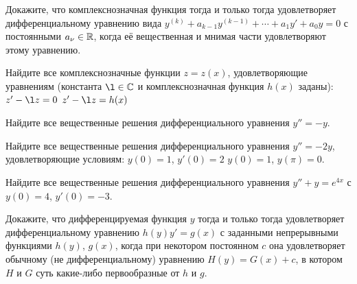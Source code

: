 \documentclass[a4paper, 12pt]{article}
\begin{document}
  Докажите, что комплекснозначная функция тогда и только тогда
  удовлетворяет дифференциальному уравнению вида
  $y^{(k)}+a_{k-1}y^{(k-1)}+\cdots+a_1y'+a_0y=0$ с постоянными
  $a_\nu\in\mathbb{R}$, когда её вещественная и мнимая части удовлетворяют
  этому уравнению.














  Найдите все комплекснозначные функции $z=z(x)$, удовлетворяющие
  уравнениям (константа $\l\in\Cbb$ и комплекснозначная функция $h(x)$
  заданы):
   $z'-\l z=0$\qquad
  $z'-\l z=h(x)$














  Найдите все вещественные решения дифференциального уравнения
  $y''=-y$.














  Найдите все вещественные решения дифференциального уравнения
  $y''=-2y$, удовлетворяющие условиям:\quad
  $y(0)=1$, $y'(0)=2$\quad
  $y(0)=1$, $y(\pi)=0$.














  Найдите все вещественные решения дифференциального уравнения
  $y''+y=e^{4x}$ с $y(0)=4$, $y'(0)=-3$.


  Докажите, что дифференцируемая функция $y$ тогда и
  только тогда удовлетворяет дифференциальному уравнению
  $h(y)y'=g(x)$ с заданными непрерывными функциями $h(y)$, $g(x)$,
  когда при некотором постоянном $c$ она удовлетворяет
  обычному (не дифференциальному) уравнению $H(y)=G(x)+c$, в
  котором $H$ и $G$ суть какие-либо первообразные от $h$ и $g$.
\end{document}
